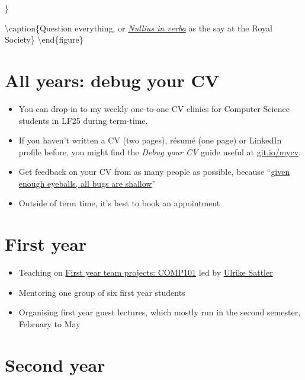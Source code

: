 \documentclass[12pt,]{book}
\providecommand{\tightlist}{%
  \setlength{\itemsep}{0pt}\setlength{\parskip}{0pt}}
\begin{document}
\}

\textbackslash{}caption\{Question everything, or \emph{\href{https://en.wikipedia.org/wiki/Nullius_in_verba}{Nullius in verba}} as the say at the Royal Society\}\label{fig:unnamed-chunk-2}
\textbackslash{}end\{figure\}

\hypertarget{all-years-debug-your-cv}{%
\section{All years: debug your CV}\label{all-years-debug-your-cv}}

\begin{itemize}
\tightlist
\item
  You can drop-in to my weekly one-to-one CV clinics for Computer Science students in LF25 during term-time.
\item
  If you haven't written a CV (two pages), résumé (one page) or LinkedIn profile before, you might find the \emph{Debug your CV} guide useful at \href{http://git.io/mycv}{git.io/mycv}.
\item
  Get feedback on your CV from as many people as possible, because ``\href{https://en.wikipedia.org/wiki/Linus\%27s_Law}{given enough eyeballs, all bugs are shallow}'' \citep{Raymond1999}
\item
  Outside of term time, it's best to book an appointment
\end{itemize}

\hypertarget{first-year}{%
\section{First year}\label{first-year}}

\begin{itemize}
\tightlist
\item
  Teaching on \href{https://studentnet.cs.manchester.ac.uk/ugt/COMP10120/syllabus/}{First year team projects: COMP101} led by \href{http://www.cs.man.ac.uk/~sattler/}{Ulrike Sattler}
\item
  Mentoring one group of six first year students
\item
  Organising first year guest lectures, which mostly run in the second semester, February to May
\end{itemize}

\hypertarget{second-year}{%
\section{Second year}\label{second-year}}
\end{document}
